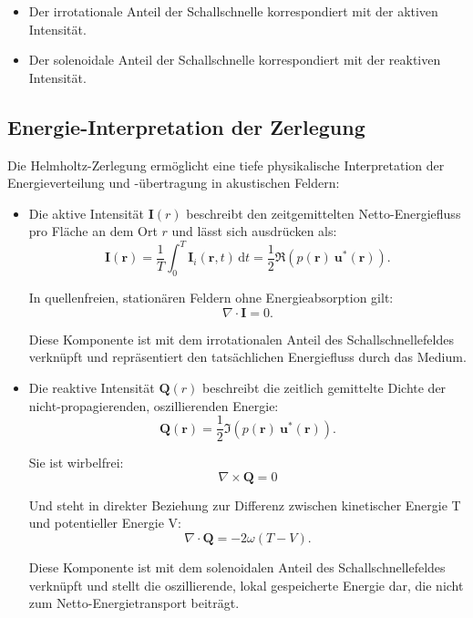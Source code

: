 \begin{itemize}
\item Der irrotationale Anteil der Schallschnelle korrespondiert mit der aktiven Intensität.
\item Der solenoidale Anteil der Schallschnelle korrespondiert mit der reaktiven Intensität.
\end{itemize}

\subsection{Energie-Interpretation der Zerlegung
\label{helmholtz:Energie_Interpretation}}
 
Die Helmholtz-Zerlegung ermöglicht eine tiefe physikalische Interpretation der Energieverteilung und -übertragung in akustischen Feldern:
 
\begin{itemize}
\item Die aktive Intensität $\mathbf{I}(r)$ beschreibt den zeitgemittelten Netto-Energiefluss pro Fläche an dem Ort $r$ und lässt sich ausdrücken als:
\begin{equation}
\mathbf{I}(\mathbf{r}) = \frac{1}{T}\int_0^T \mathbf{I}_i(\mathbf{r},t)\,\mathrm{d}t = \frac{1}{2}\Re\left( p(\mathbf{r})~\mathbf{u}^*(\mathbf{r})\right).
\end{equation}
 
In quellenfreien, stationären Feldern ohne Energieabsorption gilt:
\begin{equation}
\nabla \cdot \mathbf{I} = 0.
\end{equation}
 
Diese Komponente ist mit dem irrotationalen Anteil des Schallschnellefeldes verknüpft und repräsentiert den tatsächlichen Energiefluss durch das Medium.
 
\item Die reaktive Intensität $\mathbf{Q}(r)$ beschreibt die zeitlich gemittelte Dichte der nicht-propagierenden, oszillierenden Energie:
\begin{equation}
\mathbf{Q}(\mathbf{r}) = \frac{1}{2}\Im\left(p(\mathbf{r})~\mathbf{u}^*(\mathbf{r})\right).
\end{equation}
 
Sie ist wirbelfrei:
\begin{equation}
\nabla \times \mathbf{Q} = 0
\end{equation}
 
Und steht in direkter Beziehung zur Differenz zwischen kinetischer Energie T und potentieller Energie V:
\begin{equation}
\nabla \cdot \mathbf{Q} = -2 \omega (T-V).
\end{equation}
 
Diese Komponente ist mit dem solenoidalen Anteil des Schallschnellefeldes verknüpft und stellt die oszillierende, lokal gespeicherte Energie dar, die nicht zum Netto-Energietransport beiträgt.
\end{itemize}
 
